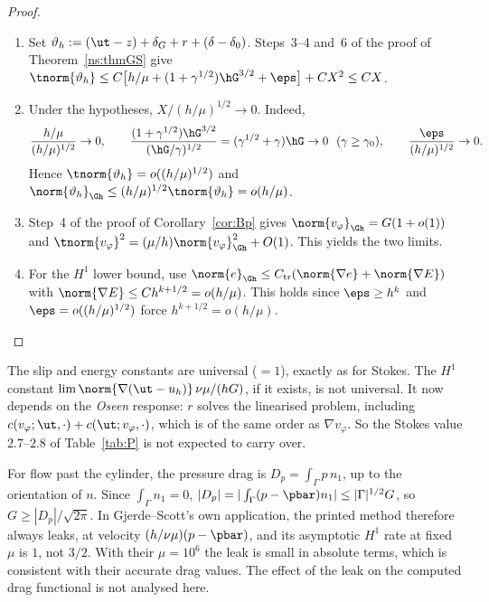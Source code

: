 \begin{proof}
\begin{enumerate}
\item Set $\vartheta_h:=(\ut-z)+\delta_G+r+(\delta-\delta_0)$. Steps~3--4 and~6 of the proof of Theorem~\ref{ns:thmGS} give $\tnorm{\vartheta_h}\le C\bigl[h/\mu+(1+\gamma^{1/2})\hG^{3/2}+\eps\bigr]+CX^2\le CX$.
\item Under the hypotheses, $X/(h/\mu)^{1/2}\to0$. Indeed,
\[
\frac{h/\mu}{(h/\mu)^{1/2}}\to0,\qquad \frac{(1+\gamma^{1/2})\hG^{3/2}}{(\hG/\gamma)^{1/2}}=(\gamma^{1/2}+\gamma)\hG\to0\ \ (\gamma\ge\gamma_0),\qquad \frac{\eps}{(h/\mu)^{1/2}}\to0 .
\]
Hence $\tnorm{\vartheta_h}=o((h/\mu)^{1/2})$ and $\norm{\vartheta_h}_{\Gh}\le(h/\mu)^{1/2}\tnorm{\vartheta_h}=o(h/\mu)$.
\item Step~4 of the proof of Corollary~\ref{cor:Bp} gives $\norm{v_\varphi}_{\Gh}=G(1+o(1))$ and $\tnorm{v_\varphi}^2=(\mu/h)\norm{v_\varphi}^2_{\Gh}+O(1)$. This yields the two limits.
\item For the $H^1$ lower bound, use $\norm{e}_{\Gh}\le C_{\mathrm{tr}}(\norm{\nabla e}+\norm{\nabla E})$ with $\norm{\nabla E}\le Ch^{k+1/2}=o(h/\mu)$. This holds since $\eps\ge h^k$ and $\eps=o((h/\mu)^{1/2})$ force $h^{k+1/2}=o(h/\mu)$.\qedhere
\end{enumerate}
\end{proof}

\begin{remark}\label{ns:H1const}
The slip and energy constants are universal ($=1$), exactly as for Stokes. The $H^1$ constant $\lim\norm{\nabla(\ut-u_h)}\,\nu\mu/(hG)$, if it exists, is not universal. It now depends on the \emph{Oseen} response: $r$ solves the linearised problem, including $c(v_\varphi;\ut,\cdot)+c(\ut;v_\varphi,\cdot)$, which is of the same order as $\nabla v_\varphi$. So the Stokes value $2.7$--$2.8$ of Table~\ref{tab:P} is not expected to carry over.
\end{remark}

\begin{remark}\label{ns:drag}
For flow past the cylinder, the pressure drag is $D_p=\int_\Gamma p\,n_1$, up to the orientation of $n$. Since $\int_\Gamma n_1=0$, $|D_p|=|\int_\Gamma(p-\pbar)n_1|\le|\Gamma|^{1/2}G$, so $G\ge|D_p|/\sqrt{2\pi}$. In Gjerde--Scott's own application, the printed method therefore always leaks, at velocity $(h/\nu\mu)(p-\pbar)$, and its asymptotic $H^1$ rate at fixed $\mu$ is $1$, not $3/2$. With their $\mu=10^6$ the leak is small in absolute terms, which is consistent with their accurate drag values. The effect of the leak on the computed drag functional is not analysed here.
\end{remark}

